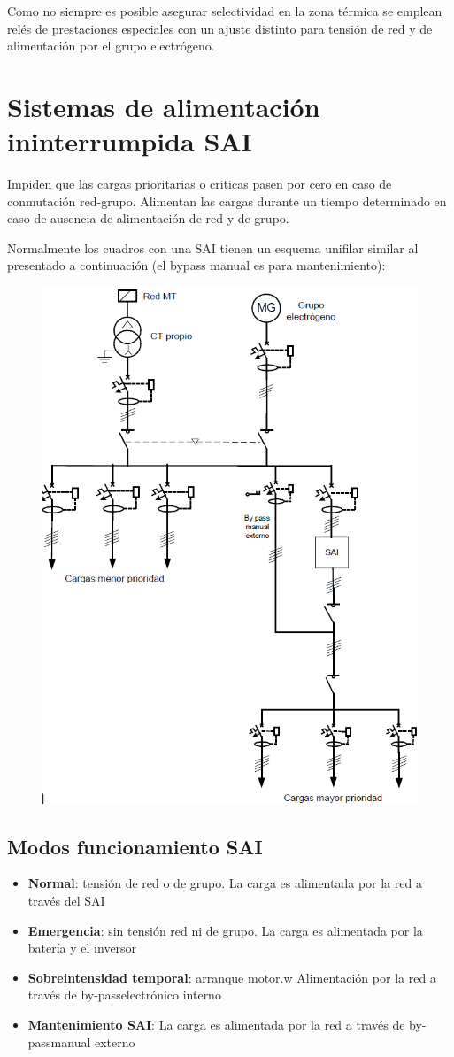 Como no siempre es posible asegurar selectividad en la zona térmica se emplean relés de prestaciones especiales con un ajuste distinto para tensión de red y de alimentación por el grupo electrógeno.
\section{Sistemas de alimentación ininterrumpida SAI}
Impiden que las cargas prioritarias o criticas pasen por cero en caso de conmutación red-grupo. Alimentan las cargas durante un tiempo determinado en caso de ausencia de alimentación de red y de grupo. 
\newline

Normalmente los cuadros con una SAI tienen un esquema unifilar similar al presentado a continuación (el bypass manual es para mantenimiento):
\begin{figure}[H]
	\centering
	\includegraphics[width=0.7\linewidth]{Images/22}
\end{figure}

\subsection{Modos funcionamiento SAI}
\begin{itemize}
	\item \textbf{Normal}: tensión de red o de grupo.
	La carga es alimentada por la red a través del SAI
\item
	\textbf{Emergencia}: sin tensión red ni de grupo.
	La carga es alimentada por la batería y el inversor
\item
	\textbf{Sobreintensidad temporal}: arranque motor.w
	Alimentación por la red a través de by-passelectrónico interno
	\item
	\textbf{Mantenimiento SAI}:
	La carga es alimentada por la red a través de by-passmanual externo
	
	

\end{itemize}

